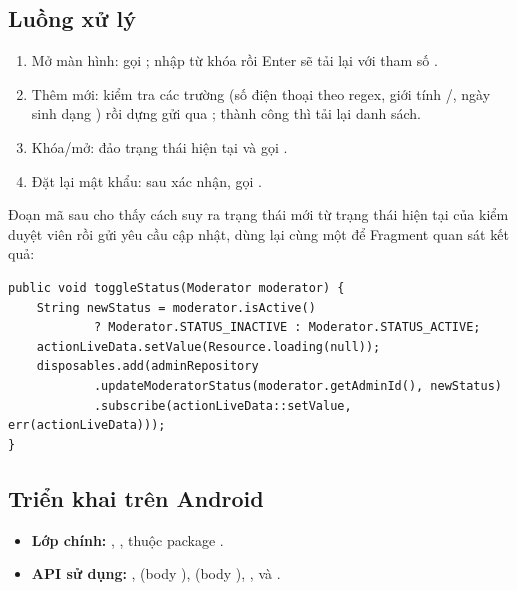 \subsection{Luồng xử lý}
\begin{enumerate}
    \item Mở màn hình:  gọi ; nhập từ khóa rồi Enter sẽ tải lại với tham số
    .
    \item Thêm mới:  kiểm tra các trường (số điện thoại
    theo regex, giới tính /, ngày sinh dạng
    ) rồi dựng  gửi qua
    ; thành công thì tải lại danh sách.
    \item Khóa/mở:  đảo trạng thái hiện tại và gọi
    .
    \item Đặt lại mật khẩu: sau xác nhận, gọi
    .
\end{enumerate}

Đoạn mã sau cho thấy cách  suy ra trạng thái mới từ trạng
thái hiện tại của kiểm duyệt viên rồi gửi yêu cầu cập nhật, dùng lại cùng một
 để Fragment quan sát kết quả:

\begin{lstlisting}[caption={Đảo trạng thái hoạt động của kiểm duyệt viên}, label={lst:c6_toggle}]
public void toggleStatus(Moderator moderator) {
    String newStatus = moderator.isActive()
            ? Moderator.STATUS_INACTIVE : Moderator.STATUS_ACTIVE;
    actionLiveData.setValue(Resource.loading(null));
    disposables.add(adminRepository
            .updateModeratorStatus(moderator.getAdminId(), newStatus)
            .subscribe(actionLiveData::setValue, err(actionLiveData)));
}
\end{lstlisting}

\subsection{Triển khai trên Android}
\begin{itemize}
    \item \textbf{Lớp chính:} ,
    ,  thuộc package
    .
    \item \textbf{API sử dụng:} ,
     (body ),
     (body
    ),
    , và
    .
\end{itemize}

